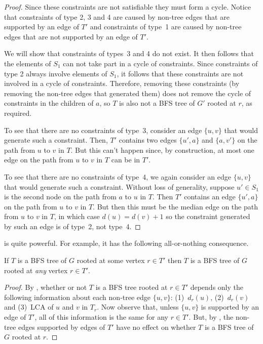 \documentclass[lotsofwhite]{patmorin}
\newcommand{\layer}{d}
\begin{document}
\begin{proof}
Since these constraints are not satisfiable they must form a cycle.
Notice that constraints of type 2, 3 and 4 are caused by non-tree
edges that are supported by an edge of $T'$ and constraints of type~1
are caused by non-tree edges that are not supported by an edge of
$T'$. 

We will show that constraints of types~3 and 4 do not exist.  It then
follows that the elements of $S_1$ can not take part in a cycle of
constraints.  Since constraints of type 2 always involve elements of
$S_1$, it follows that these constraints are not involved in a cycle
of constraints.  Therefore, removing these constraints (by removing
the non-tree edges that generated them) does not remove the cycle of
constraints in the children of $a$, so $T$ is also not a BFS tree of
$G'$ rooted at $r$, as required.

To see that there are no constraints of type~3, consider an edge
$\{u,v\}$ that would generate such a constraint.  Then, $T'$ contains
two edges $\{u',a\}$ and $\{a,v'\}$ on the path from $u$ to $v$ in
$T$.  But this can't happen since, by construction, at most one edge
on the path from $u$ to $v$ in $T$ can be in $T'$.

To see that there are no constraints of type~4, we again consider an
edge $\{u,v\}$ that would generate such a constraint.  Without loss of
generality, suppose $u'\in S_1$ is the second node on the path from
$a$ to $u$ in $T$.  Then $T'$ contains an edge $\{u',a\}$ on the path
from $u$ to $v$ in $T$.  But then this must be the median edge on the
path from $u$ to $v$ in $T$, in which case $\layer(u)=\layer(v)+1$ so
the constraint generated by such an edge is of type~2, not type~4.
\end{proof}

 is quite powerful.  For example, it has the following
all-or-nothing consequence.

\begin{lem}
If $T$ is a BFS tree of $G$ rooted at some vertex $r\in T'$ then $T$
is a BFS tree of $G$ rooted at \emph{any} vertex $r\in T'$.
\end{lem}

\begin{proof} 
By , whether or not $T$ is a BFS tree rooted at
$r\in T'$ depends only the following information about each non-tree
edge $\{u,v\}$: (1)~$\layer_r(u)$, (2)~$\layer_r(v)$ and (3)~LCA of
$u$ and $v$ in $T_r$.  Now observe that, unless $\{u,v\}$ is supported
by an edge of $T'$, all of this information is the same for any $r\in
T'$.  But, by , the non-tree edges supported by edges
of $T'$ have no effect on whether $T$ is a BFS tree of $G$ rooted at $r$.
\end{proof}
\end{document}
